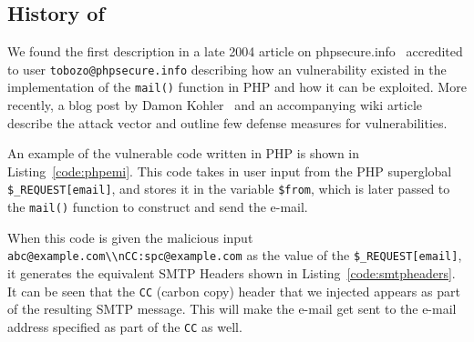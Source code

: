 \subsection{History of \ehi}

We found the first \ehi description in a late 2004 article on phpsecure.info~\cite{Tobozo} accredited to user \lstinline|tobozo@phpsecure.info| describing how an \ehi vulnerability existed in the implementation of the \texttt{mail()} function in PHP and how it can be exploited. More recently, a blog post by Damon Kohler~\cite{DK} and an accompanying wiki article~\cite{Injection} describe the attack vector and outline few defense measures for \ehi vulnerabilities.


An example of the vulnerable code written in PHP is shown in Listing~\ref{code:phpemi}. This code takes in user input from the PHP superglobal \texttt{\$\_REQUEST[\textquotesingle email\textquotesingle]}, and stores it in the variable \texttt{\$from}, which is later passed to the \texttt{mail()} function to construct and send the e-mail.




\begin{sloppypar}
When this code is given the malicious input \texttt{\lstinline{abc@example.com\\nCC:spc@example.com}} as the value of the \texttt{\$\_REQUEST[\textquotesingle email\textquotesingle]}, it generates the equivalent SMTP Headers shown in Listing~\ref{code:smtpheaders}. It can be seen that the \texttt{CC} (carbon copy) header that we injected appears as part of the resulting SMTP message. This will make the e-mail get sent to the e-mail address specified as part of the \texttt{CC} as well. 

%
\end{sloppypar}